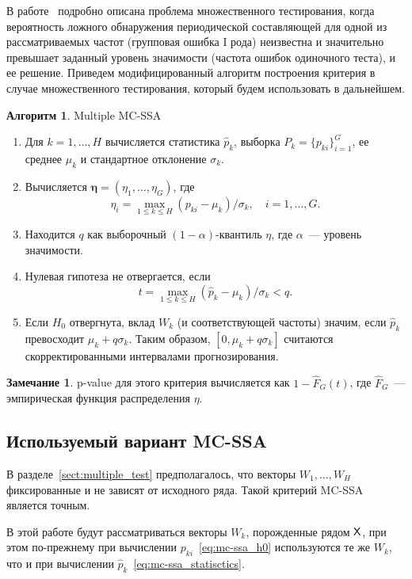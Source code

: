 \documentclass[specialist,
substylefile = spbu.rtx,
               subf,href,colorlinks=true,12pt]{disser}
\theoremstyle{definition}
\newtheorem{algorithm}{Алгоритм}
\newtheorem{remark}{Замечание}
\begin{document}
В работе~\cite{Golyandina2023} подробно описана проблема множественного тестирования, когда вероятность ложного обнаружения периодической составляющей для одной из рассматриваемых частот (групповая ошибка I рода) неизвестна и значительно превышает заданный уровень значимости (частота ошибок одиночного теста), и ее решение. Приведем модифицированный алгоритм построения критерия в случае множественного тестирования, который будем использовать в дальнейшем.
\begin{algorithm}{Multiple MC-SSA~\cite{Golyandina2023}}\label{alg:multiple_mc-ssa}
	\begin{enumerate}
		\item Для $k=1,\dots,H$ вычисляется статистика $\widehat{p}_k$, выборка $P_k=\{p_{ki}\}_{i=1}^G$, ее среднее $\mu_k$ и стандартное отклонение $\sigma_k$.
		\item Вычисляется $\mathbf{\eta}=(\eta_1,\dots,\eta_G)$, где
		      \[
			      \eta_i=\max_{1\leqslant k\leqslant H}(p_{ki}-\mu_k)/\sigma_k,\quad i=1,\dots,G.
		      \]
		\item Находится $q$ как выборочный $(1-\alpha)$-квантиль $\eta$, где $\alpha$~--- уровень значимости.
		\item Нулевая гипотеза не отвергается, если
		      \[
			      t = \max_{1\leqslant k\leqslant H}(\widehat{p}_k-\mu_k)/\sigma_k<q.
		      \]
		\item Если $H_0$ отвергнута, вклад $W_k$ (и соответствующей частоты) значим, если $\widehat{p}_k$ превосходит $\mu_k+q\sigma_k$. Таким образом, $[0,\mu_k+q\sigma_k]$ считаются скорректированными интервалами прогнозирования.
	\end{enumerate}
\end{algorithm}

\begin{remark}
	p-value для этого критерия вычисляется как $1-\hat F_G(t)$, где $\hat F_G$~--- эмпирическая функция распределения $\eta$.
\end{remark}

\subsection{Используемый вариант MC-SSA}\label{sect:vectors_choise}
В разделе~\ref{sect:multiple_test} предполагалось, что векторы $W_1,\ldots, W_H$ фиксированные и не зависят от исходного ряда. Такой критерий MC-SSA является точным.

В этой работе будут рассматриваться векторы $W_k$, порожденные рядом $\mathsf{X}$, при этом по-прежнему при вычислении $p_{ki}$~\eqref{eq:mc-ssa_h0} используются те же $W_k$, что и при вычислении $\widehat p_k$~\eqref{eq:mc-ssa_statisctics}. 
\end{document}
